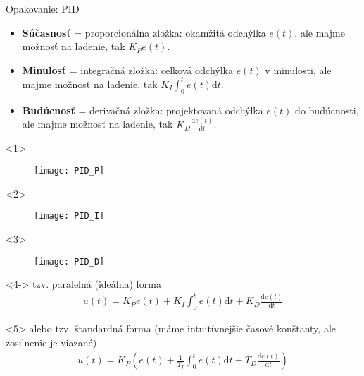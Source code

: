 \documentclass{beamer}
\begin{document}
\begin{frame}[t]{Opakovanie: PID}
  \begin{itemize}
    \item<1-> \textbf{Súčasnosť} = proporcionálna zložka: okamžitá odchýlka $e(t)$, ale majme možnosť na ladenie, tak $K_Pe(t)$.
    \item<2-> \textbf{Minulosť} = integračná zložka: celková odchýlka $e(t)$ v minulosti, ale majme možnosť na ladenie, tak $K_I\int_0^te(t)\mathrm{d}t$.
    \item<3-> \textbf{Budúcnosť} = derivačná zložka: projektovaná odchýlka $e(t)$ do budúcnosti, ale majme možnosť na ladenie, tak $K_D\frac{\mathrm{d}e(t)}{\mathrm{d}t}$.
  \end{itemize}

\begin{onlyenv}<1>
\begin{figure}
\centering
  \texttt{[image: PID\_P]}\\
\end{figure}
\end{onlyenv}

\begin{onlyenv}<2>
\begin{figure}
\centering
  \texttt{[image: PID\_I]}\\
\end{figure}
\end{onlyenv}

\begin{onlyenv}<3>
\begin{figure}
\centering
  \texttt{[image: PID\_D]}\\
\end{figure}
\end{onlyenv}


\begin{onlyenv}<4->
tzv. paralelná (ideálna) forma
\begin{align}
u(t)= K_Pe(t)+K_I\int_0^te(t)\mathrm{d}t+K_D\frac{\mathrm{d}e(t)}{\mathrm{d}t}
\end{align}
\end{onlyenv}

\begin{onlyenv}<5>
alebo tzv. štandardná forma (máme intuitívnejšie časové konštanty, ale zosilnenie je viazané)
\begin{align}
u(t)= K_P\left(e(t)+\frac{1}{T_I}\int_0^te(t)\mathrm{d}t+T_D\frac{\mathrm{d}e(t)}{\mathrm{d}t}\right)
\end{align}
\end{onlyenv}
\end{frame}
\end{document}
